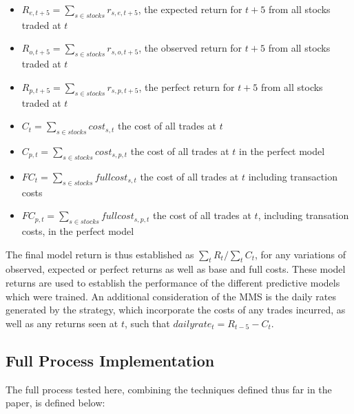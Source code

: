 \documentclass[a4paper,latin]{paper}
\begin{document}
\begin{itemize}
	\item $R_{e, {t+5}} = \sum_{s \in stocks} r_{s, e, {t+5}}$, the expected return for $t+5$ from all stocks traded at $t$
	\item $R_{o, {t+5}} = \sum_{s \in stocks} r_{s, o, {t+5}}$, the observed return for $t+5$ from all stocks traded at $t$
	\item $R_{p, {t+5}} = \sum_{s \in stocks} r_{s, p, {t+5}}$, the perfect return for $t+5$ from all stocks traded at $t$	
	\item $C_t = \sum_{s \in stocks} cost_{s,t}$ the cost of all trades at $t$
	\item $C_{p,t} = \sum_{s \in stocks} cost_{s, p ,t}$ the cost of all trades at $t$ in the perfect model
	\item $FC_t = \sum_{s \in stocks} fullcost_{s,t}$ the cost of all trades at $t$ including transaction costs
	\item $FC_{p,t} = \sum_{s \in stocks} fullcost_{s, p ,t}$ the cost of all trades at $t$, including transation costs, in the perfect model	
\end{itemize}
\hfill\break
The final model return is thus established as $\sum_t{R_t} / \sum_t{C_t} $, for any variations of observed, expected or perfect returns as well as base and full costs. These model returns are used to establish the performance of the different predictive models which were trained.\newline
\hfill\break
An additional consideration of the MMS is the daily rates generated by the strategy, which incorporate the costs of any trades incurred, as well as any returns seen at $t$, such that $dailyrate_t = R_{t-5} - C_t$.

\subsection{Full Process Implementation}\label{imp_fullprocess}

The full process tested here, combining the techniques defined thus far in the paper, is defined  below:
\end{document}
